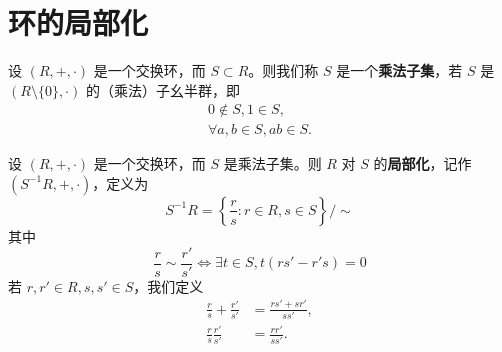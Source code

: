\documentclass[../../main.tex]{subfiles}
\begin{document}
\section{环的局部化}

\begin{definition}[乘法子集]
设 $(R, +, \cdot)$ 是一个交换环，而 $S \subset R$。则我们称 $S$ 是一个\textbf{乘法子集}，若 $S$ 是 $(R \setminus \{0\}, \cdot)$ 的（乘法）子幺半群，即
\begin{gather*}
0 \notin S, 1 \in S ,\\
\forall a, b \in S, ab \in S .
\end{gather*}
\end{definition}


\begin{definition}[(交换)环的局部化]\label{definition:(交换)环的局部化}
设 $(R, +, \cdot)$ 是一个交换环，而 $S$ 是乘法子集。则 $R$ 对 $S$ 的\textbf{局部化}，记作 $(S^{-1}R, +, \cdot)$，定义为
\[S^{-1}R = \left\{\frac{r}{s} : r \in R, s \in S\right\} / \sim\]
其中
\[\frac{r}{s} \sim \frac{r'}{s'} \iff \exists t \in S, t(rs' - r's) = 0\]
若 $r, r' \in R, s, s' \in S$，我们定义
\begin{align*}
\frac{r}{s} + \frac{r'}{s'} &= \frac{rs' + sr'}{ss'},\\
\frac{r}{s}\frac{r'}{s'} &= \frac{rr'}{ss'}.
\end{align*}
\end{definition}
\end{document}
